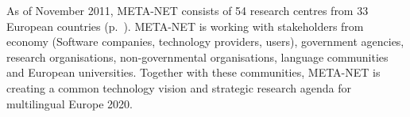 \begin{Parallel}[c]{75mm}{81mm}
{As of November 2011, META-NET consists of 54 research centres from 33
European countries (p.~\pageref{metanetmembers}). META-NET is working
with stakeholders from economy (Software companies, technology
providers, users), government agencies, research organisations,
non-governmental organisations, language communities and European
universities. Together with these communities, META-NET is creating a
common technology vision and strategic research agenda for
multilingual Europe 2020.}

\ParallelPar
\end{Parallel}


\cleardoublepage


\tableofcontents



\cleardoublepage

\setcounter{page}{1}
\pagestyle{scrheadings}


